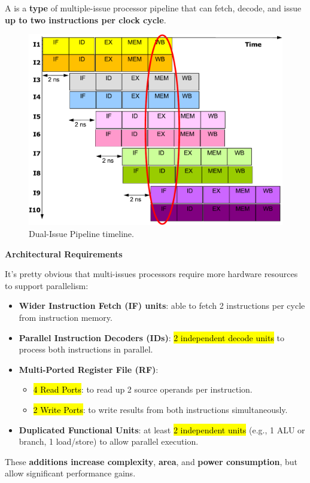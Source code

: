 \begin{definitionbox}
    A  is a \textbf{type} of multiple-issue processor pipeline that can fetch, decode, and issue \textbf{up to two instructions per clock cycle}.
\end{definitionbox}

\begin{figure}[!htp]
    \centering
    \includegraphics[width=.8\textwidth]{img/dual-issue-pipeline.pdf}
    \caption{Dual-Issue Pipeline timeline.}
\end{figure}

\begin{flushleft}
    \textcolor{Red2}{ \textbf{Architectural Requirements}}
\end{flushleft}
It's pretty obvious that multi-issues processors require more hardware resources to support parallelism:
\begin{itemize}
    \item \textbf{Wider Instruction Fetch (IF) units}: able to fetch 2 instructions per cycle from instruction memory.
    \item \textbf{Parallel Instruction Decoders (IDs)}: \hl{2 independent decode units} to process both instructions in parallel.
    \item \textbf{Multi-Ported Register File (RF)}:
    \begin{itemize}
        \item \hl{4 Read Ports}: to read up 2 source operands per instruction.
        \item \hl{2 Write Ports}: to write results from both instructions simultaneously.
    \end{itemize}
    \item \textbf{Duplicated Functional Units}: at least \hl{2 independent units} (e.g., 1 ALU or branch, 1 load/store) to allow parallel execution.
\end{itemize}
These \textbf{additions increase complexity}, \textbf{area}, and \textbf{power consumption}, but allow significant performance gains.

